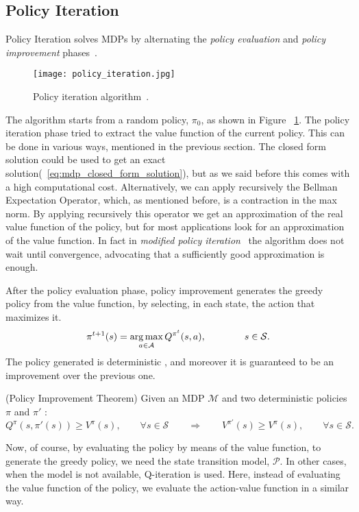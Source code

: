 \subsection{Policy Iteration}
Policy Iteration solves MDPs by alternating the \emph{policy evaluation} and \emph{policy improvement} phases~\cite{howard:dynamic60}.
\begin{figure}
  \texttt{[image: policy\_iteration.jpg]}
  \caption{Policy iteration algorithm~\cite{Sutton:1998:IRL:551283}.}
  \label{fig:policy_iteration}
\end{figure}
The algorithm starts from a random policy, $\pi_0$, as shown in Figure ~\ref{fig:policy_iteration}. The policy iteration phase tried to extract the value function of the current policy. This can be done in various ways, mentioned in the previous section. The closed form solution could be used to get an exact solution(~\ref{eq:mdp_closed_form_solution}), but as we said before this comes with a high computational cost. Alternatively, we can apply recursively the Bellman Expectation Operator, which, as mentioned before, is a contraction in the max norm. By applying recursively this operator we get an approximation of the real value function of the policy, but for most applications look for an approximation of the value function. In fact in \emph{modified policy iteration}~\cite{Puterman:1978:MPI:2828482.2828486} the algorithm does not wait until convergence, advocating that a sufficiently good approximation is enough.\par
After the policy evaluation phase, policy improvement generates the greedy policy from the value function, by selecting, in each state, the action that maximizes it.
\begin{equation}
	\pi^{t+1}(s)=\operatorname*{arg\,max}_{a \in \mathcal{A}} Q^{\pi^t}(s,a), \qquad \qquad s \in \mathcal{S}.
\end{equation}
The policy generated is deterministic , and moreover it is guaranteed to be an improvement over the previous one.
\begin{theorem}
(Policy Improvement Theorem) Given an MDP $\mathcal{M}$ and two deterministic policies $\pi$ and $\pi′$ :
\begin{equation*}
	Q^\pi(s,\pi'(s)) \geq V^\pi(s), \qquad \forall s \in \mathcal{S} \qquad \Rightarrow \qquad V^{\pi'}(s) \geq V^\pi(s),	\qquad \forall s \in \mathcal{S}.
\end{equation*}
\end{theorem}
Now, of course, by evaluating the policy by means of the value function, to generate the greedy policy, we need the state transition model, $\mathcal{P}$. In other cases, when the model is not available, Q-iteration is used. Here, instead of evaluating the value function of the policy, we evaluate the action-value function in a similar way.
